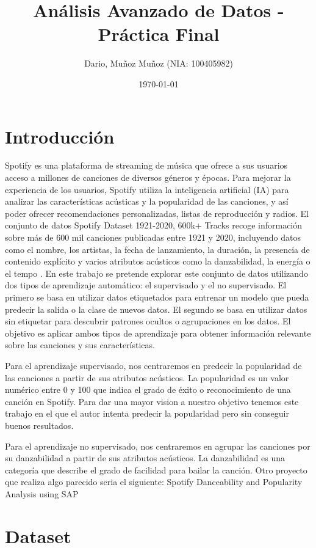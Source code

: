 \documentclass{wsdcr}
\title{Análisis Avanzado de Datos - Práctica Final}
\author{Dario, Muñoz Muñoz (NIA: 100405982)}
\date{\today}
\begin{document}
\maketitle

\section{Introducción}
Spotify es una plataforma de streaming de música que ofrece a sus usuarios acceso a millones de canciones de diversos géneros y épocas. Para mejorar la experiencia de los usuarios, Spotify utiliza la inteligencia artificial (IA) para analizar las características acústicas y la popularidad de las canciones, y así poder ofrecer recomendaciones personalizadas, listas de reproducción y radios. El conjunto de datos Spotify Dataset 1921-2020, 600k+ Tracks recoge información sobre más de 600 mil canciones publicadas entre 1921 y 2020, incluyendo datos como el nombre, los artistas, la fecha de lanzamiento, la duración, la presencia de contenido explícito y varios atributos acústicos como la danzabilidad, la energía o el tempo \cite{SpotifyDataset}. En este trabajo se pretende explorar este conjunto de datos utilizando dos tipos de aprendizaje automático: el supervisado y el no supervisado. El primero se basa en utilizar datos etiquetados para entrenar un modelo que pueda predecir la salida o la clase de nuevos datos. El segundo se basa en utilizar datos sin etiquetar para descubrir patrones ocultos o agrupaciones en los datos. El objetivo es aplicar ambos tipos de aprendizaje para obtener información relevante sobre las canciones y sus características.

Para el aprendizaje supervisado, nos centraremos en predecir la popularidad de las canciones a partir de sus atributos acústicos. La popularidad es un valor numérico entre 0 y 100 que indica el grado de éxito o reconocimiento de una canción en Spotify. Para dar una mayor vision a nuestro objetivo tenemos este trabajo \cite{PredictingPopularityonSpotify} en el que el autor intenta predecir la popularidad pero sin conseguir buenos resultados.

Para el aprendizaje no supervisado, nos centraremos en agrupar las canciones por su danzabilidad a partir de sus atributos acústicos. La danzabilidad es una categoría que describe el grado de facilidad para bailar la canción. Otro proyecto que realiza algo parecido seria el siguiente: Spotify Danceability and Popularity Analysis using SAP \cite{SpotifyAnalysis}

\section{Dataset}
\end{document}
